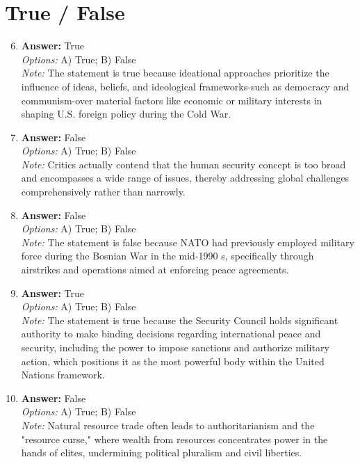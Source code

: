\documentclass[12pt]{article}
\begin{document}
\section*{True / False}
\begin{enumerate}[label=\arabic*.]
\setcounter{enumi}{5}
\item \textbf{Answer:} True
\\ \textit{Options:} A) True; B) False
\\ \textit{Note:} The statement is true because ideational approaches prioritize the influence of ideas, beliefs, and ideological frameworks-such as democracy and communism-over material factors like economic or military interests in shaping U.S. foreign policy during the Cold War.
\item \textbf{Answer:} False
\\ \textit{Options:} A) True; B) False
\\ \textit{Note:} Critics actually contend that the human security concept is too broad and encompasses a wide range of issues, thereby addressing global challenges comprehensively rather than narrowly.
\item \textbf{Answer:} False
\\ \textit{Options:} A) True; B) False
\\ \textit{Note:} The statement is false because NATO had previously employed military force during the Bosnian War in the mid-1990 s, specifically through airstrikes and operations aimed at enforcing peace agreements.
\item \textbf{Answer:} True
\\ \textit{Options:} A) True; B) False
\\ \textit{Note:} The statement is true because the Security Council holds significant authority to make binding decisions regarding international peace and security, including the power to impose sanctions and authorize military action, which positions it as the most powerful body within the United Nations framework.
\item \textbf{Answer:} False
\\ \textit{Options:} A) True; B) False
\\ \textit{Note:} Natural resource trade often leads to authoritarianism and the "resource curse," where wealth from resources concentrates power in the hands of elites, undermining political pluralism and civil liberties.
\end{enumerate}
\end{document}
